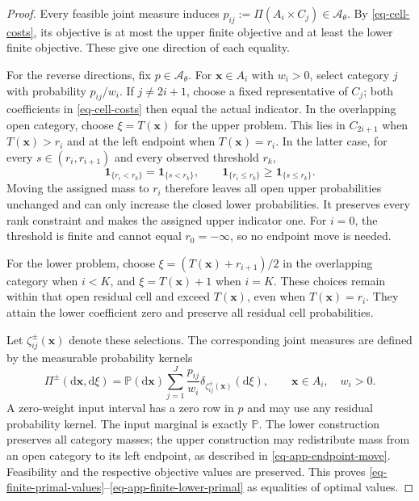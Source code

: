 \begin{proof}
  Every feasible joint measure induces $p_{ij}:=\Pi(A_i\times C_j)\in\mathcal A_\theta$. By \eqref{eq-cell-costs}, its objective is at most the upper finite objective and at least the lower finite objective. These give one direction of each equality.

  For the reverse directions, fix $p\in\mathcal A_\theta$. For $\bm x\in A_i$ with $w_i>0$, select category $j$ with probability $p_{ij}/w_i$. If $j\ne2i+1$, choose a fixed representative of $C_j$; both coefficients in \eqref{eq-cell-costs} then equal the actual indicator. In the overlapping open category, choose $\xi=T(\bm x)$ for the upper problem. This lies in $C_{2i+1}$ when $T(\bm x)>r_i$ and at the left endpoint when $T(\bm x)=r_i$. In the latter case, for every $s\in(r_i,r_{i+1})$ and every observed threshold $r_k$,
  \begin{equation}
    \mathbf1_{\{r_i<r_k\}}=\mathbf1_{\{s<r_k\}},\qquad
    \mathbf1_{\{r_i\le r_k\}}\ge\mathbf1_{\{s\le r_k\}}.
    \label{eq-app-endpoint-move}
  \end{equation}
  Moving the assigned mass to $r_i$ therefore leaves all open upper probabilities unchanged and can only increase the closed lower probabilities. It preserves every rank constraint and makes the assigned upper indicator one. For $i=0$, the threshold is finite and cannot equal $r_0=-\infty$, so no endpoint move is needed.

  For the lower problem, choose $\xi=(T(\bm x)+r_{i+1})/2$ in the overlapping category when $i<K$, and $\xi=T(\bm x)+1$ when $i=K$. These choices remain within that open residual cell and exceed $T(\bm x)$, even when $T(\bm x)=r_i$. They attain the lower coefficient zero and preserve all residual cell probabilities.

  Let $\zeta_{ij}^{\pm}(\bm x)$ denote these selections. The corresponding joint measures are defined by the measurable probability kernels
  \begin{equation}
    \Pi^{\pm}\left(\mathrm d\bm x,\mathrm d\xi\right)
    =\mathbb P\left(\mathrm d\bm x\right)
    \sum_{j=1}^J\frac{p_{ij}}{w_i}
    \delta_{\zeta_{ij}^{\pm}(\bm x)}\left(\mathrm d\xi\right),
    \qquad\bm x\in A_i,\quad w_i>0.
    \label{eq-app-lifting-kernels}
  \end{equation}
  A zero-weight input interval has a zero row in $p$ and may use any residual probability kernel. The input marginal is exactly $\mathbb P$. The lower construction preserves all category masses; the upper construction may redistribute mass from an open category to its left endpoint, as described in \eqref{eq-app-endpoint-move}. Feasibility and the respective objective values are preserved. This proves \eqref{eq-finite-primal-values}--\eqref{eq-app-finite-lower-primal} as equalities of optimal values.


\end{proof}
